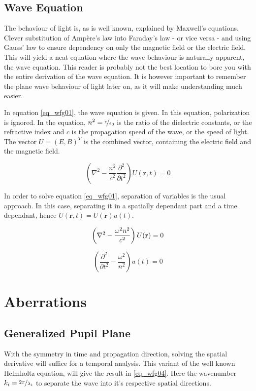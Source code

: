 \documentclass{article}
\begin{document}
\subsection{Wave Equation}
The behaviour of light is, as is well known, explained by Maxwell's equations. Clever substitution of Amp\`{e}re's law into Faraday's law - or vice versa - and using Gauss' law to ensure dependency on only the magnetic field or the electric field. This will yield a neat equation where the wave behaviour is naturally apparent, the wave equation. This reader is probably not the best location to bore you with the entire derivation of the wave equation. It is however important to remember the plane wave behaviour of light later on, as it will make understanding much easier.

In equation \ref{eq_wfg01}, the wave equation is given. In this equation, polarization is ignored. In the equation, $n^2 = \nicefrac{\epsilon}{\epsilon_0}$ is the ratio of the dielectric constants, or the refractive index and $c$ is the propagation speed of the wave, or the speed of light. The vector $U = (E, B)^T$ is the combined vector, containing the electric field and the magnetic field.

\begin{equation}
\label{eq_wfg01}
\left( \nabla^2 - \frac{n^2}{c^2} \frac{\partial^2}{\partial t^2} \right) U(\textbf{r},t) = 0 
\end{equation}

In order to solve equation \ref{eq_wfg01}, separation of variables is the usual approach. In this case, separating it in a spatially dependant part and a time dependant, hence $U(\textbf{r},t) = U(\textbf{r}) u(t)$. 

\begin{equation}
\label{eq_wfg02}
\left(\nabla^2 - \frac{\omega^2 n^2}{c^2}\right) U(\textbf{r}) = 0\\
\end{equation}
	
\begin{equation}
\label{eq_wfg03}
\left(\frac{\partial^2}{\partial t^2}- \frac{\omega^2}{n^2}\right) u(t) = 0
\end{equation}

\newpage
\section{Aberrations}
\subsection{Generalized Pupil Plane}
With the symmetry in time and propagation direction, solving the spatial derivative will suffice for a temporal analysis. This variant of the well known Helmholtz equation, will give the result in \ref{eq_wfg04}. Here the wavenumber $k_i = \nicefrac{2\pi}{\lambda_i}$ to separate the wave into it's respective spatial directions.
\end{document}
